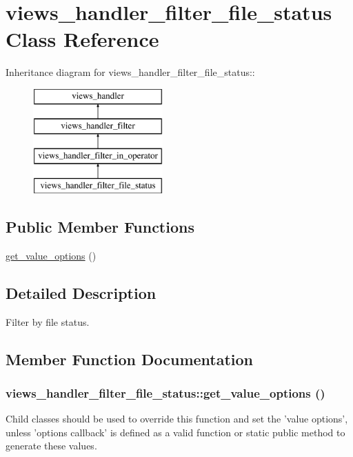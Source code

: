 \hypertarget{classviews__handler__filter__file__status}{
\section{views\_\-handler\_\-filter\_\-file\_\-status Class Reference}
\label{classviews__handler__filter__file__status}
}
Inheritance diagram for views\_\-handler\_\-filter\_\-file\_\-status::\begin{figure}[H]
\begin{center}
\leavevmode
\includegraphics[height=4cm]{classviews__handler__filter__file__status}
\end{center}
\end{figure}
\subsection*{Public Member Functions}
\begin{DoxyCompactItemize}
\item 
\hyperlink{classviews__handler__filter__file__status_a06c9422d87bde6108c51d45e9d5568f4}{get\_\-value\_\-options} ()
\end{DoxyCompactItemize}


\subsection{Detailed Description}
Filter by file status. 

\subsection{Member Function Documentation}
\hypertarget{classviews__handler__filter__file__status_a06c9422d87bde6108c51d45e9d5568f4}{
\subsubsection[{get\_\-value\_\-options}]{\setlength{\rightskip}{0pt plus 5cm}views\_\-handler\_\-filter\_\-file\_\-status::get\_\-value\_\-options ()}}
\label{classviews__handler__filter__file__status_a06c9422d87bde6108c51d45e9d5568f4}
Child classes should be used to override this function and set the 'value options', unless 'options callback' is defined as a valid function or static public method to generate these values.

